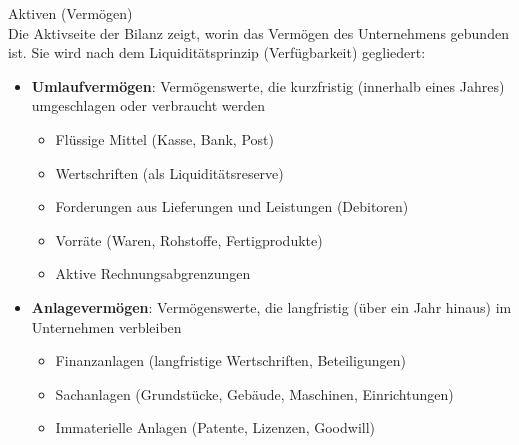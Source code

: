 \begin{definition}{Aktiven (Vermögen)}\\
Die Aktivseite der Bilanz zeigt, worin das Vermögen des Unternehmens gebunden ist. Sie wird nach dem Liquiditätsprinzip (Verfügbarkeit) gegliedert:
\begin{itemize}
    \item \textbf{Umlaufvermögen}: Vermögenswerte, die kurzfristig (innerhalb eines Jahres) umgeschlagen oder verbraucht werden
    \begin{itemize}
        \item Flüssige Mittel (Kasse, Bank, Post)
        \item Wertschriften (als Liquiditätsreserve)
        \item Forderungen aus Lieferungen und Leistungen (Debitoren)
        \item Vorräte (Waren, Rohstoffe, Fertigprodukte)
        \item Aktive Rechnungsabgrenzungen
    \end{itemize}
    \item \textbf{Anlagevermögen}: Vermögenswerte, die langfristig (über ein Jahr hinaus) im Unternehmen verbleiben
    \begin{itemize}
        \item Finanzanlagen (langfristige Wertschriften, Beteiligungen)
        \item Sachanlagen (Grundstücke, Gebäude, Maschinen, Einrichtungen)
        \item Immaterielle Anlagen (Patente, Lizenzen, Goodwill)
    \end{itemize}
\end{itemize}
\end{definition}


